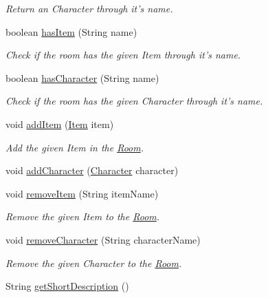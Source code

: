 \begin{DoxyCompactItemize}
\begin{DoxyCompactList}\small\item\em Return an Character through it's name. \end{DoxyCompactList}\item 
boolean \hyperlink{classpkg__world_1_1Room_aefa26e1bc5088dd199dde2e9d471c490}{has\-Item} (String name)
\begin{DoxyCompactList}\small\item\em Check if the room has the given Item through it's name. \end{DoxyCompactList}\item 
boolean \hyperlink{classpkg__world_1_1Room_a96612764dfeea7855090e586f02da188}{has\-Character} (String name)
\begin{DoxyCompactList}\small\item\em Check if the room has the given Character through it's name. \end{DoxyCompactList}\item 
void \hyperlink{classpkg__world_1_1Room_a118585101b274edfdd43b724382de89c}{add\-Item} (\hyperlink{classpkg__world_1_1pkg__items_1_1Item}{Item} item)
\begin{DoxyCompactList}\small\item\em Add the given Item in the \hyperlink{classpkg__world_1_1Room}{Room}. \end{DoxyCompactList}\item 
void \hyperlink{classpkg__world_1_1Room_a8446601b93b79b1e0ab0c8be500f40b1}{add\-Character} (\hyperlink{classpkg__world_1_1pkg__characters_1_1Character}{Character} character)
\item 
void \hyperlink{classpkg__world_1_1Room_ab84c99b33e69d4a3e0700cab4b9efeaa}{remove\-Item} (String item\-Name)
\begin{DoxyCompactList}\small\item\em Remove the given Item to the \hyperlink{classpkg__world_1_1Room}{Room}. \end{DoxyCompactList}\item 
void \hyperlink{classpkg__world_1_1Room_adca74901eed0132c7bb9ba15b993ac0b}{remove\-Character} (String character\-Name)
\begin{DoxyCompactList}\small\item\em Remove the given Character to the \hyperlink{classpkg__world_1_1Room}{Room}. \end{DoxyCompactList}\item 
String \hyperlink{classpkg__world_1_1Room_adb98ed16e34549faabed35f90673d266}{get\-Short\-Description} ()

\end{DoxyCompactItemize}
